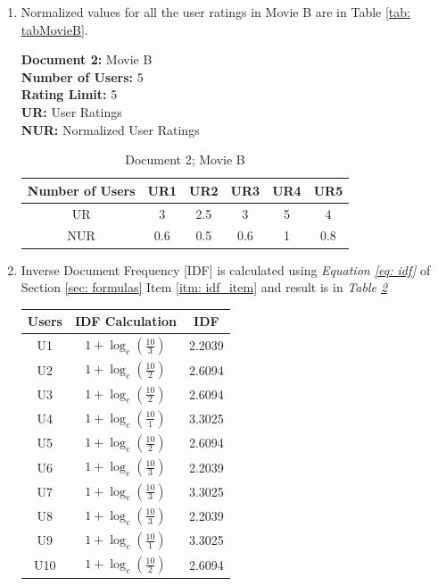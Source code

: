 \documentclass[12pt, titlepage, onecolumn]{article}
\begin{document}
{\begin{enumerate}
	\item Normalized values for all the user ratings in Movie B are in Table \ref{tab: tabMovieB}.
	
		{\bf Document 2: } Movie B\\
		{\bf Number of Users: }5\\
		{\bf Rating Limit: }5\\
		{\bf UR: }User Ratings\\
		{\bf NUR: }Normalized User Ratings	
		\begin{table}[ht]
		\label{tab: tabMovieB}
		\begin{center}
		\begin{tabular}{cccccc}
    		\hline
       			Number of Users	&	UR1	&	UR2	&	UR3	&	UR4	&	UR5\\
		\hline
    			UR				&	3	&	2.5	&	3	&	5	&	4\\
			NUR				&	0.6	&	0.5	&	0.6	&	1	&	0.8\\
    		\hline
		\end{tabular}
		\caption{Document 2; Movie B}
		\end{center}
		\label{tab:movieB}
		\end{table}
		
	\item Inverse Document Frequency [IDF] is calculated using \emph{Equation \ref{eq: idf}} of Section \ref{sec: formulas} Item \ref{itm: idf_item} and result is in \emph{Table \ref{tab: tabidf}}
	\begin{table}[ht]
	\label{tab: tabidf}
		\begin{center}
		\begin{tabular}{|c|c|c|}
    		\hline
       			Users	&	IDF Calculation					&	IDF\\
		\hline
    			U1		&	$1+\log_{e}(\frac{10}{3})$			&	2.2039\\
			U2		&	$1+\log_{e}(\frac{10}{2})$			&	2.6094\\
			U3		&	$1+\log_{e}(\frac{10}{2})$			&	2.6094\\
			U4		&	$1+\log_{e}(\frac{10}{1})$			&	3.3025\\
			U5		&	$1+\log_{e}(\frac{10}{2})$			&	2.6094\\
			U6		&	$1+\log_{e}(\frac{10}{3})$			&	2.2039\\
			U7		&	$1+\log_{e}(\frac{10}{3})$			&	3.3025\\
			U8		&	$1+\log_{e}(\frac{10}{3})$			&	2.2039\\
			U9		&	$1+\log_{e}(\frac{10}{1})$			&	3.3025\\
			U10		&	$1+\log_{e}(\frac{10}{2})$			&	2.6094\\
			

\end{tabular}
\end{center}
\end{table}
\end{enumerate}}
\end{document}
